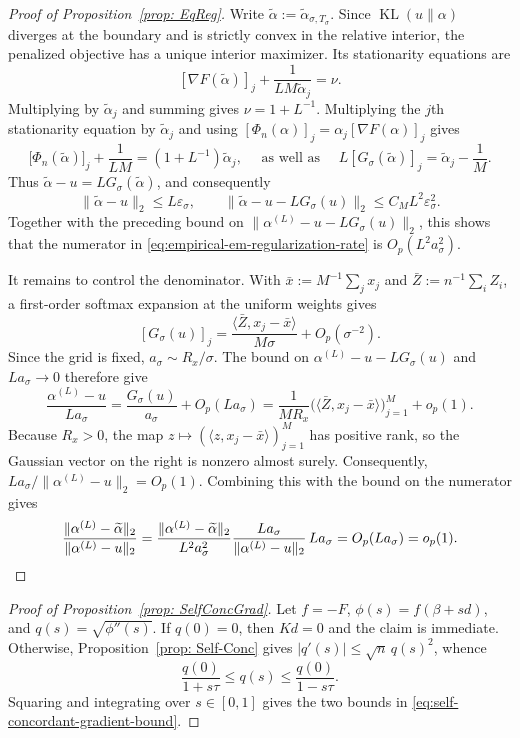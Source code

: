 \documentclass[12pt]{iopart}
\theoremstyle{remark}
\begin{document}
\begin{proof}[Proof of Proposition~\ref{prop: EqReg}]
Write $\widetilde\alpha:=\widetilde\alpha_{\sigma,T_\sigma}$. Since
$\operatorname{KL}(u\|\alpha)$ diverges at the boundary and is strictly
convex in the relative interior, the penalized objective has a unique interior
maximizer. Its stationarity equations are
\[
[\nabla F(\widetilde\alpha)]_j
+\frac{1}{LM\widetilde\alpha_j}=\nu.
\]
Multiplying by $\widetilde\alpha_j$ and summing gives
$\nu=1+L^{-1}$. Multiplying the $j$th stationarity equation by
$\widetilde\alpha_j$ and using
$[\Phi_n(\alpha)]_j=\alpha_j[\nabla F(\alpha)]_j$ gives
\[
\bigl[\Phi_n(\widetilde\alpha)\bigr]_j+\frac1{LM}
=(1+L^{-1})\widetilde\alpha_j,
\quad \text{ as well as } \quad 
L[G_\sigma(\widetilde\alpha)]_j
=\widetilde\alpha_j-\frac1M.
\]
Thus $\widetilde\alpha-u=LG_\sigma(\widetilde\alpha)$, and consequently
\[
\|\widetilde\alpha-u\|_2\leq L\varepsilon_\sigma,
\qquad
\|\widetilde\alpha-u-LG_\sigma(u)\|_2
\leq C_ML^2\varepsilon_\sigma^2.
\]
Together with the preceding bound on
$\|\alpha^{(L)}-u-LG_\sigma(u)\|_2$, this shows that the numerator in
\eqref{eq:empirical-em-regularization-rate} is $O_p(L^2a_\sigma^2)$.

It remains to control the denominator. With
$\bar x:=M^{-1}\sum_jx_j$ and $\bar Z:=n^{-1}\sum_iZ_i$, a first-order
softmax expansion at the uniform weights gives
\[
[G_\sigma(u)]_j
=\frac{\langle\bar Z,x_j-\bar x\rangle}{M\sigma}
+O_p(\sigma^{-2}).
\]
Since the grid is fixed, $a_\sigma\sim R_x/\sigma$. The bound on
$\alpha^{(L)}-u-LG_\sigma(u)$ and $La_\sigma\to0$ therefore give
\[
\frac{\alpha^{(L)}-u}{La_\sigma}
=\frac{G_\sigma(u)}{a_\sigma}+O_p(La_\sigma)
=\frac1{MR_x}
\bigl(\langle\bar Z,x_j-\bar x\rangle\bigr)_{j=1}^M+o_p(1).
\]
Because $R_x>0$, the map
$z\mapsto(\langle z,x_j-\bar x\rangle)_{j=1}^M$ has positive rank, so the
Gaussian vector on the right is nonzero almost surely. Consequently,
$La_\sigma/\|\alpha^{(L)}-u\|_2=O_p(1)$.
Combining this with the bound on the numerator gives
\[
\frac{\|\alpha^{(L)}-\widetilde\alpha\|_2}
{\|\alpha^{(L)}-u\|_2}
=\frac{\|\alpha^{(L)}-\widetilde\alpha\|_2}
{L^2a_\sigma^2}
\frac{La_\sigma}{\|\alpha^{(L)}-u\|_2}\,La_\sigma
=O_p(La_\sigma)=o_p(1). \qedhere
\]
\end{proof}


\begin{proof}[Proof of Proposition~\ref{prop: SelfConcGrad}]
Let $f=-F$, $\phi(s)=f(\beta+sd)$, and $q(s)=\sqrt{\phi''(s)}$.
If $q(0)=0$, then $Kd=0$ and the claim is immediate. Otherwise,
Proposition~\ref{prop: Self-Conc} gives
$|q'(s)|\leq\sqrt n\,q(s)^2$, whence
\[
\frac{q(0)}{1+s\tau}\leq q(s)\leq\frac{q(0)}{1-s\tau}.
\]
Squaring and integrating over $s\in[0,1]$ gives the two bounds in
\eqref{eq:self-concordant-gradient-bound}.
\end{proof}
\end{document}
